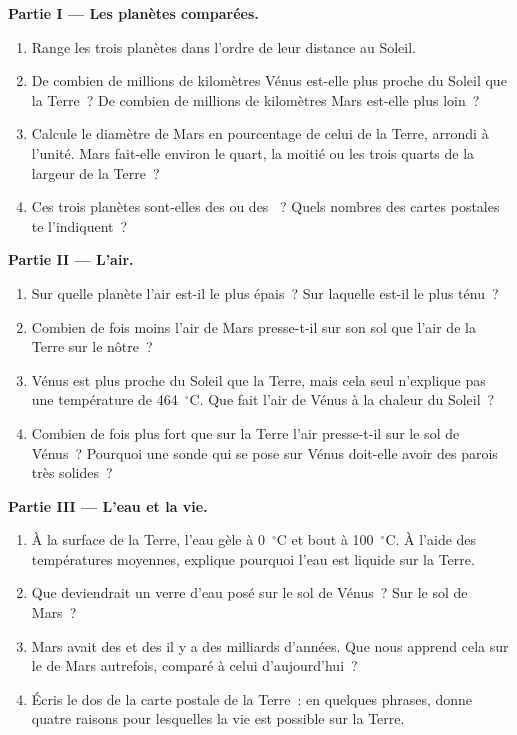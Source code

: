 \begin{problem}
\medskip
\noindent\textbf{Partie I --- Les planètes comparées.}
\begin{enumerate}
  \item Range les trois planètes dans l'ordre de leur distance au Soleil.
  \item De combien de millions de kilomètres Vénus est-elle plus proche du
        Soleil que la Terre~? De combien de millions de kilomètres Mars
        est-elle plus loin~?
  \item Calcule le diamètre de Mars en pourcentage de celui de la Terre,
        arrondi à l'unité. Mars fait-elle environ le quart, la moitié ou les
        trois quarts de la largeur de la Terre~?
  \item Ces trois planètes sont-elles des  ou des
        ~? Quels nombres des cartes postales te
        l'indiquent~?
\end{enumerate}

\medskip
\noindent\textbf{Partie II --- L'air.}
\begin{enumerate}[resume]
  \item Sur quelle planète l'air est-il le plus épais~? Sur laquelle est-il
        le plus ténu~?
  \item Combien de fois moins l'air de Mars presse-t-il sur son sol que
        l'air de la Terre sur le nôtre~?
  \item Vénus est plus proche du Soleil que la Terre, mais cela seul
        n'explique pas une température de 464~$^\circ$C. Que fait l'air de
        Vénus à la chaleur du Soleil~?
  \item Combien de fois plus fort que sur la Terre l'air presse-t-il sur le
        sol de Vénus~? Pourquoi une sonde qui se pose sur Vénus doit-elle
        avoir des parois très solides~?
\end{enumerate}

\medskip
\noindent\textbf{Partie III --- L'eau et la vie.}
\begin{enumerate}[resume]
  \item À la surface de la Terre, l'eau gèle à 0~$^\circ$C et bout à
        100~$^\circ$C. À l'aide des températures moyennes, explique pourquoi
        l'eau est liquide sur la Terre.
  \item Que deviendrait un verre d'eau posé sur le sol de Vénus~? Sur le sol
        de Mars~?
  \item Mars avait des  et des  il y a des milliards d'années.
        Que nous apprend cela sur le  de Mars autrefois, comparé à
        celui d'aujourd'hui~?
  \item Écris le dos de la carte postale de la Terre~: en quelques phrases,
        donne quatre raisons pour lesquelles la vie est possible sur la
        Terre.
\end{enumerate}
\end{problem}
